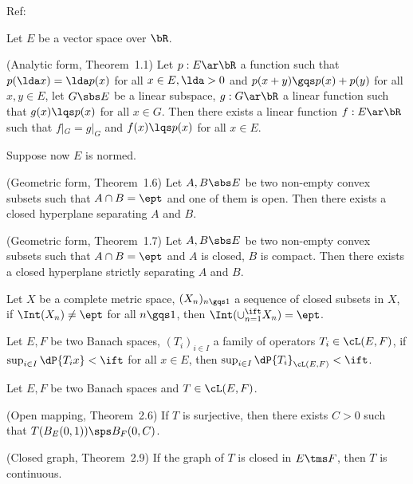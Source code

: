 \documentclass[article, a4paper, twoside]{universal}
\begin{document}
\confighead{}{}{}



Ref:~\cite{Brezis2011}


\begin{thm}
    Let $E$ be a vector space over $\bR$.
    \begin{enr}[label=(\arabic*)]
        \item (Analytic form, Theorem~1.1) Let $p:E\ar\bR$ a function such that $p(\lda x)=\lda p(x)$ for all $x\in E,\lda>0$ and $p(x+y)\gqs p(x)+p(y)$ for all $x,y\in E$, let $G\sbs E$ be a linear subspace, $g:G\ar\bR$ a linear function such that $g(x)\lqs p(x)$ for all $x\in G$. Then there exists a linear function $f:E\ar\bR$ such that $f|_{G}=g|_{G}$ and $f(x)\lqs p(x)$ for all $x\in E$.


        Suppose now $E$ is normed.
        \item (Geometric form, Theorem~1.6) Let $A,B\sbs E$ be two non-empty convex subsets such that $A\cap B=\ept$ and one of them is open. Then there exists a closed hyperplane separating $A$ and $B$.
        \item (Geometric form, Theorem~1.7) Let $A,B\sbs E$ be two non-empty convex subsets such that $A\cap B=\ept$ and $A$ is closed, $B$ is compact. Then there exists a closed hyperplane strictly separating $A$ and $B$.
    \end{enr}

\end{thm}

\begin{thm}
    Let $X$ be a complete metric space, $(X_{n})_{n\gqs1}$ a sequence of closed subsets in $X$, if $\Int(X_{n})\neq\ept$ for all $n\gqs1$, then $\Int(\cup_{n=1}^{\ift}X_{n})=\ept$.
\end{thm}

\begin{thm}
    Let $E,F$ be two Banach spaces, $(T_{i})_{i\in I}$ a family of operators $T_{i}\in\cL(E,F)$, if $\sup_{i\in I}\dP{T_{i}x}<\ift$ for all $x\in E$, then $\sup_{i\in I}\dP{T_{i}}_{\cL(E,F)}<\ift$.
\end{thm}

\begin{thm}[]
    Let $E,F$ be two Banach spaces and $T\in\cL(E,F)$.
    \begin{enr}[label=(\arabic*)]
        \item (Open mapping, Theorem~2.6) If $T$ is surjective, then there exists $C>0$ such that $T(B_{E}(0,1))\sps B_{F}(0,C)$.
        \item (Closed graph, Theorem~2.9) If the graph of $T$ is closed in $E\tms F$, then $T$ is continuous.
    \end{enr}
\end{thm}
\end{document}
